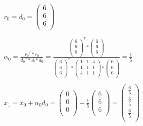 \documentclass[10pt,DIV10,a4paper]{scrartcl}
\begin{document}
\(r_0=d_0=\left(
\begin{array}{c}
 6 \\
 6 \\
 6 \\
\end{array}
\right)\)

\(\alpha _0=\frac{r_0{}^T* r_0}{d_0{}^T*A *d_0}=\frac{\left(
\begin{array}{c}
 6 \\
 6 \\
 6 \\
\end{array}
\right)^T* \left(
\begin{array}{c}
 6 \\
 6 \\
 6 \\
\end{array}
\right)}{\left(
\begin{array}{c}
 6 \\
 6 \\
 6 \\
\end{array}
\right)^T* \left(
\begin{array}{ccc}
 1 & 1 & 4 \\
 1 & 1 & 1 \\
 4 & 1 & 1 \\
\end{array}
\right)*\left(
\begin{array}{c}
 6 \\
 6 \\
 6 \\
\end{array}
\right) }=\frac{1}{5}\)

\(x_1= x_0+\alpha _0d_0= \left(
\begin{array}{c}
 0 \\
 0 \\
 0 \\
\end{array}
\right) + \frac{1}{5}\left(
\begin{array}{c}
 6 \\
 6 \\
 6 \\
\end{array}
\right) = \left(
\begin{array}{c}
 \frac{6}{5} \\
 \frac{6}{5} \\
 \frac{6}{5} \\
\end{array}
\right)\)
\end{document}
